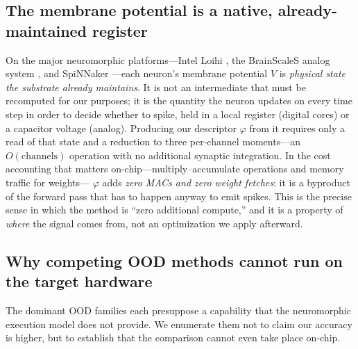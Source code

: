 \subsection{The membrane potential is a native, already-maintained register}
\label{sec:hardware-register}

On the major neuromorphic platforms---Intel Loihi \cite{davies2018loihi}, the BrainScaleS
analog system \cite{schemmel2010brainscales}, and SpiNNaker \cite{furber2014spinnaker}---each
neuron's membrane potential $V$ is \emph{physical state the substrate already maintains}. It
is not an intermediate that must be recomputed for our purposes; it is the quantity the neuron
updates on every time step in order to decide whether to spike, held in a local register
(digital cores) or a capacitor voltage (analog). Producing our descriptor $\varphi$ from it
requires only a read of that state and a reduction to three per-channel moments---an
$O(\text{channels})$ operation with no additional synaptic integration. In the cost accounting
that matters on-chip---multiply--accumulate operations and memory traffic for weights---%
$\varphi$ adds \emph{zero MACs and zero weight fetches}: it is a byproduct of the forward pass
that has to happen anyway to emit spikes. This is the precise sense in which the method is
``zero additional compute,'' and it is a property of \emph{where} the signal comes from, not
an optimization we apply afterward.

\subsection{Why competing OOD methods cannot run on the target hardware}
\label{sec:hardware-table}

The dominant OOD families each presuppose a capability that the neuromorphic execution model
does not provide. We enumerate them not to claim our accuracy is higher, but to establish that
the comparison cannot even take place on-chip.


